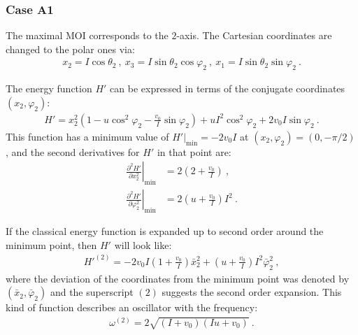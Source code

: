 \subsubsection*{Case A1}

The maximal MOI corresponds to the $2$-axis. The Cartesian coordinates are changed to the polar ones via:
\begin{align}
    x_2=I\cos\theta_2\ ,\ x_3=I\sin\theta_2\cos\varphi_2\ ,\ x_1=I\sin\theta_2\sin\varphi_2\ .
    \label{polar-coordinates-case-a1}
\end{align}

The energy function $H'$ can be expressed in terms of the conjugate coordinates $(x_2,\varphi_2)$:
\begin{align}
    H'=x_2^2\left(1-u\cos^2\varphi_2-\frac{v_0}{I}\sin\varphi_2\right)+uI^2\cos^2\varphi_2+2v_0I\sin\varphi_2\ .
    \label{classical-energy-new-boson-2-axis}
\end{align}
This function has a minimum value of $H'\vert_\text{min}=-2v_0I$ at $(x_2,\varphi_2)=(0,-\pi/2)$, and the second derivatives for $H'$ in that point are:
\begin{align}
    \left.\frac{\partial^2H'}{\partial x_2^2}\right\vert_\text{min}&=2\left(2+\frac{v_0}{I}\right)\ ,\nonumber\\
    \left.\frac{\partial^2 H'}{\partial \varphi_2^2}\right\vert_\text{min}&=2\left(u+\frac{v_0}{I}\right)I^2\ .
\end{align}

If the classical energy function is expanded up to second order around the minimum point, then $H'$ will look like:
\begin{align}
    H'^{(2)}=-2v_0I\left(1+\frac{v_0}{I}\right)\bar{x}_2^2+\left(u+\frac{v_0}{I}\right)I^2\bar{\varphi}_2^2\ ,
\end{align}
where the deviation of the coordinates from the minimum point was denoted by $(\bar{x}_2,\bar{\varphi}_2)$ and the superscript $(2)$ suggests the second order expansion. This kind of function describes an oscillator with the frequency:
\begin{align}
    \omega^{(2)}=2\sqrt{(I+v_0)(Iu+v_0)}\ .
\end{align}

